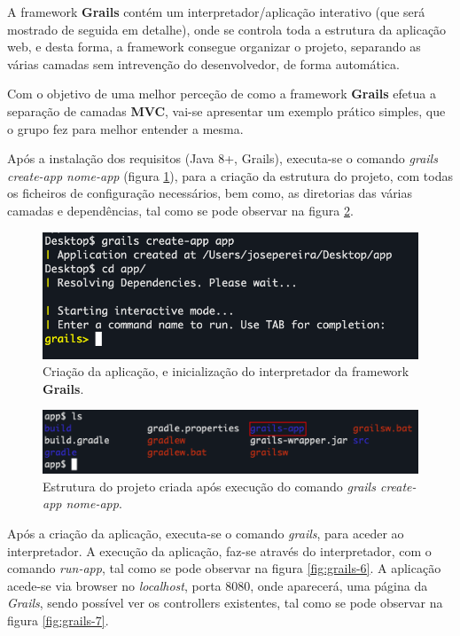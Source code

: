 \hspace{5mm} A framework \textbf{Grails} contém um interpretador/aplicação interativo (que será mostrado de seguida em detalhe), onde se controla toda a estrutura da aplicação web, e desta forma, a framework consegue organizar o projeto, separando as várias camadas sem intrevenção do desenvolvedor, de forma automática.

\hspace{5mm} Com o objetivo de uma melhor perceção de como a framework \textbf{Grails} efetua a separação de camadas \textbf{MVC}, vai-se apresentar um exemplo prático simples, que o grupo fez para melhor entender a mesma.

\hspace{5mm} Após a instalação dos requisitos (Java 8+, Grails), executa-se o comando \textit{grails create-app nome-app} (figura \ref{fig:grails-1}), para a criação da estrutura do projeto, com todas os ficheiros de configuração necessários, bem como, as diretorias das várias camadas e dependências, tal como se pode observar na figura \ref{fig:grails-2}.

\begin{figure}[H]
    \centering
    \includegraphics[scale=0.45]{images/grails-1.png}
    \caption{Criação da aplicação, e inicialização do interpretador da framework \textbf{Grails}.}
    \label{fig:grails-1}
\end{figure}

\begin{figure}[H]
    \centering
    \includegraphics[scale=0.50]{images/grails-2.png}
    \caption{Estrutura do projeto criada após execução do comando \textit{grails create-app nome-app}.}
    \label{fig:grails-2}
\end{figure}

\hspace{5mm} Após a criação da aplicação, executa-se o comando \textit{grails}, para aceder ao interpretador. A execução da aplicação, faz-se através do interpretador, com o comando \textit{run-app}, tal como se pode observar na figura \ref{fig:grails-6}. A aplicação acede-se via browser no \textit{localhost}, porta 8080, onde aparecerá, uma página da \textit{Grails}, sendo possível ver os controllers existentes, tal como se pode observar na figura \ref{fig:grails-7}. 


